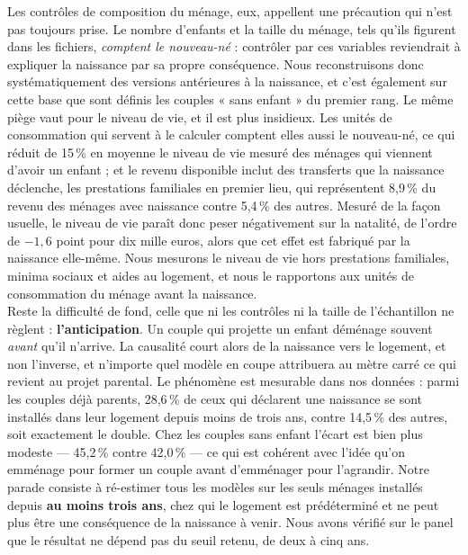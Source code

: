 \documentclass[12pt,a4paper]{article}
\begin{document}
\noindent Les contrôles de composition du ménage, eux, appellent une précaution qui n'est pas toujours prise. Le nombre d'enfants et la taille du ménage, tels qu'ils figurent dans les fichiers, \textit{comptent le nouveau-né} : contrôler par ces variables reviendrait à expliquer la naissance par sa propre conséquence. Nous reconstruisons donc systématiquement des versions antérieures à la naissance, et c'est également sur cette base que sont définis les couples « sans enfant » du premier rang. Le même piège vaut pour le niveau de vie, et il est plus insidieux. Les unités de consommation qui servent à le calculer comptent elles aussi le nouveau-né, ce qui réduit de 15\,\% en moyenne le niveau de vie mesuré des ménages qui viennent d'avoir un enfant ; et le revenu disponible inclut des transferts que la naissance déclenche, les prestations familiales en premier lieu, qui représentent 8,9\,\% du revenu des ménages avec naissance contre 5,4\,\% des autres. Mesuré de la façon usuelle, le niveau de vie paraît donc peser négativement sur la natalité, de l'ordre de $-1{,}6$ point pour dix mille euros, alors que cet effet est fabriqué par la naissance elle-même. Nous mesurons le niveau de vie hors prestations familiales, minima sociaux et aides au logement, et nous le rapportons aux unités de consommation du ménage avant la naissance. \\

\noindent Reste la difficulté de fond, celle que ni les contrôles ni la taille de l'échantillon ne règlent : \textbf{l'anticipation}. Un couple qui projette un enfant déménage souvent \textit{avant} qu'il n'arrive. La causalité court alors de la naissance vers le logement, et non l'inverse, et n'importe quel modèle en coupe attribuera au mètre carré ce qui revient au projet parental. Le phénomène est mesurable dans nos données : parmi les couples déjà parents, 28,6\,\% de ceux qui déclarent une naissance se sont installés dans leur logement depuis moins de trois ans, contre 14,5\,\% des autres, soit exactement le double. Chez les couples sans enfant l'écart est bien plus modeste — 45,2\,\% contre 42,0\,\% — ce qui est cohérent avec l'idée qu'on emménage pour former un couple avant d'emménager pour l'agrandir. Notre parade consiste à ré-estimer tous les modèles sur les seuls ménages installés depuis \textbf{au moins trois ans}, chez qui le logement est prédéterminé et ne peut plus être une conséquence de la naissance à venir. Nous avons vérifié sur le panel que le résultat ne dépend pas du seuil retenu, de deux à cinq ans.
\end{document}
